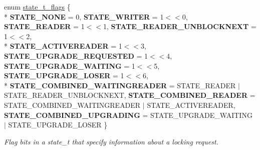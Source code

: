 \begin{DoxyCompactItemize}
\item 
\hypertarget{namespacetbb_ad819a3df876043ef1be649b4f80934ca}{}enum \hyperlink{namespacetbb_ad819a3df876043ef1be649b4f80934ca}{state\+\_\+t\+\_\+flags} \{ \\*
{\bfseries S\+T\+A\+T\+E\+\_\+\+N\+O\+N\+E} = 0, 
{\bfseries S\+T\+A\+T\+E\+\_\+\+W\+R\+I\+T\+E\+R} = 1$<$$<$0, 
{\bfseries S\+T\+A\+T\+E\+\_\+\+R\+E\+A\+D\+E\+R} = 1$<$$<$1, 
{\bfseries S\+T\+A\+T\+E\+\_\+\+R\+E\+A\+D\+E\+R\+\_\+\+U\+N\+B\+L\+O\+C\+K\+N\+E\+X\+T} = 1$<$$<$2, 
\\*
{\bfseries S\+T\+A\+T\+E\+\_\+\+A\+C\+T\+I\+V\+E\+R\+E\+A\+D\+E\+R} = 1$<$$<$3, 
{\bfseries S\+T\+A\+T\+E\+\_\+\+U\+P\+G\+R\+A\+D\+E\+\_\+\+R\+E\+Q\+U\+E\+S\+T\+E\+D} = 1$<$$<$4, 
{\bfseries S\+T\+A\+T\+E\+\_\+\+U\+P\+G\+R\+A\+D\+E\+\_\+\+W\+A\+I\+T\+I\+N\+G} = 1$<$$<$5, 
{\bfseries S\+T\+A\+T\+E\+\_\+\+U\+P\+G\+R\+A\+D\+E\+\_\+\+L\+O\+S\+E\+R} = 1$<$$<$6, 
\\*
{\bfseries S\+T\+A\+T\+E\+\_\+\+C\+O\+M\+B\+I\+N\+E\+D\+\_\+\+W\+A\+I\+T\+I\+N\+G\+R\+E\+A\+D\+E\+R} = S\+T\+A\+T\+E\+\_\+\+R\+E\+A\+D\+E\+R $\vert$ S\+T\+A\+T\+E\+\_\+\+R\+E\+A\+D\+E\+R\+\_\+\+U\+N\+B\+L\+O\+C\+K\+N\+E\+X\+T, 
{\bfseries S\+T\+A\+T\+E\+\_\+\+C\+O\+M\+B\+I\+N\+E\+D\+\_\+\+R\+E\+A\+D\+E\+R} = S\+T\+A\+T\+E\+\_\+\+C\+O\+M\+B\+I\+N\+E\+D\+\_\+\+W\+A\+I\+T\+I\+N\+G\+R\+E\+A\+D\+E\+R $\vert$ S\+T\+A\+T\+E\+\_\+\+A\+C\+T\+I\+V\+E\+R\+E\+A\+D\+E\+R, 
{\bfseries S\+T\+A\+T\+E\+\_\+\+C\+O\+M\+B\+I\+N\+E\+D\+\_\+\+U\+P\+G\+R\+A\+D\+I\+N\+G} = S\+T\+A\+T\+E\+\_\+\+U\+P\+G\+R\+A\+D\+E\+\_\+\+W\+A\+I\+T\+I\+N\+G $\vert$ S\+T\+A\+T\+E\+\_\+\+U\+P\+G\+R\+A\+D\+E\+\_\+\+L\+O\+S\+E\+R
 \}\label{namespacetbb_ad819a3df876043ef1be649b4f80934ca}
\begin{DoxyCompactList}\small\item\em Flag bits in a state\+\_\+t that specify information about a locking request. \end{DoxyCompactList}
\end{DoxyCompactItemize}
